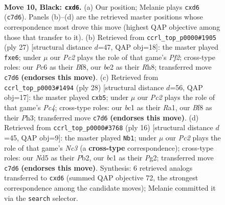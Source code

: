 \documentclass[11pt]{article}
\begin{document}
\clearpage

\begin{figure}[p]\centering
\begin{subfigure}{0.46\textwidth}\centering
\resizebox{\linewidth}{!}{%
\newchessgame
\chessboard[
  setfen={r1b1kb1r/p1p2ppp/2pP4/3n4/8/5P2/PPP1B1PP/RNB1K2R b KQkq - 0 10},
  showmover=false,
  pgfstyle=straightmove, color=movearrow, markmove={c7-d6}
]}
\caption{}
\end{subfigure}\hfill
\begin{subfigure}{0.46\textwidth}\centering
\resizebox{\linewidth}{!}{%
\newchessgame
\chessboard[
  setfen={r3kb1r/p1pn1ppp/1p2P3/8/4P3/4BP2/PP4PP/R3K1NR b KQkq - 0 14},
  showmover=false,
  pgfstyle=straightmove, color=movearrow, markmove={f7-e6}
]}
\caption{}
\end{subfigure}
\\[4pt]
\begin{subfigure}{0.46\textwidth}\centering
\resizebox{\linewidth}{!}{%
\newchessgame
\chessboard[
  setfen={rn2k2r/4bppp/p3p3/1p6/2P1b3/1B3N1P/PP2KPP1/R1B4R w kq - 2 15},
  showmover=false,
  pgfstyle=straightmove, color=movearrow, markmove={c4-b5}
]}
\caption{}
\end{subfigure}\hfill
\begin{subfigure}{0.46\textwidth}\centering
\resizebox{\linewidth}{!}{%
\newchessgame
\chessboard[
  setfen={rnb1kbnr/p4ppp/2p5/8/PppNP3/2N5/1P3PPP/R1B1KB1R w KQkq - 0 9},
  showmover=false,
  pgfstyle=straightmove, color=movearrow, markmove={c3-b1}
]}
\caption{}
\end{subfigure}
\caption{\textbf{Move 10, Black: \texttt{cxd6}.} (a) Our position; Melanie plays \texttt{cxd6} (\texttt{c7d6}). Panels (b)--(d) are the retrieved master positions whose correspondence most drove this move (highest QAP objective among those that transfer to it). (b) Retrieved from \texttt{ccrl\_top\_p0000\#1905} (ply 27) [structural distance $d$=47, QAP obj=18]: the master played \texttt{fxe6}; under $\mu$ our \emph{Pc2} plays the role of that game's \emph{Pf2}; cross-type roles: our \emph{P}c6 as their \emph{B}f8, our \emph{b}e2 as their \emph{R}h8; transferred move \texttt{c7d6} \textbf{(endorses this move)}. (c) Retrieved from \texttt{ccrl\_top\_p0003\#1494} (ply 28) [structural distance $d$=56, QAP obj=17]: the master played \texttt{cxb5}; under $\mu$ our \emph{Pc2} plays the role of that game's \emph{Pc4}; cross-type roles: our \emph{b}c1 as their \emph{R}a1, our \emph{B}f8 as their \emph{P}h3; transferred move \texttt{c7d6} \textbf{(endorses this move)}. (d) Retrieved from \texttt{ccrl\_top\_p0000\#3768} (ply 16) [structural distance $d$=45, QAP obj=9]: the master played \texttt{Nb1}; under $\mu$ our \emph{Pc2} plays the role of that game's \emph{Nc3} (a \textbf{cross-type} correspondence); cross-type roles: our \emph{N}d5 as their \emph{P}b2, our \emph{b}c1 as their \emph{P}g2; transferred move \texttt{c7d6} \textbf{(endorses this move)}. Synthesis: 6 retrieved analogs transferred to \texttt{cxd6} (summed QAP objective 72, the strongest correspondence among the candidate moves); Melanie committed it via the \texttt{search} selector.}
\label{fig:thought-m19}
\end{figure}
\end{document}
